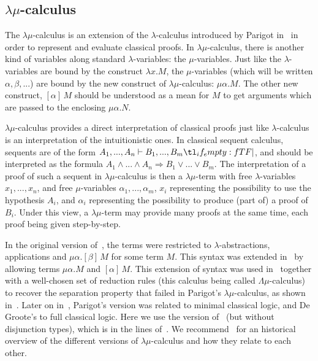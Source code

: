 \documentclass{CSML}
\renewcommand{\ldots}{...}
\newcommand*\ifpresent[3]{\tl_if_empty:fTF{#1}{#3}{#2}}
\newcommand*\Entails{\mathrel{\vdash}}
\newcommand*\BarSep{\mathrel{|}}
\newcommand*\Sequent[3]{#1\Entails#2\ifpresent{#3}{\BarSep}{}#3}
\newcommand*\LogImp{\mathbin{\Rightarrow}}
\newcommand*\LogAnd{\mathbin{\wedge}}
\newcommand*\LogFormA{A}
\newcommand*\LogFormB{B}
\newcommand*\LmTermA{M}
\newcommand*\LmTermB{N}
\newcommand*\LmVarA{x}
\newcommand*\LmMVarA\alpha
\newcommand*\LmMVarB\beta
\begin{document}
\subsection{\texorpdfstring{$\lambda\mu$}{lambda-mu}-calculus}
The $\lambda\mu$-calculus is an extension of the $\lambda$-calculus introduced by Parigot in~\cite{ParigotLambdaMu} in order to represent and evaluate classical proofs. In $\lambda\mu$-calculus, there is another kind of variables along standard $\lambda$-variables: the $\mu$-variables. Just like the $\lambda$-variables are bound by the construct $\lambda\LmVarA.\LmTermA$, the $\mu$-variables (which will be written $\alpha,\beta,\ldots$) are bound by the new construct of $\lambda\mu$-calculus: $\mu\LmMVarA.\LmTermA$. The other new construct, $\left[\LmMVarA\right]\,\LmTermA$ should be understood as a mean for $\LmTermA$ to get arguments which are passed to the enclosing $\mu\LmMVarA.\LmTermB$.\par
$\lambda\mu$-calculus provides a direct interpretation of classical proofs just like $\lambda$-calculus is an interpretation of the intuitionistic ones. In classical sequent calculus, sequents are of the form $\Sequent{\LogFormA_1,\ldots,\LogFormA_n}{\LogFormB_1,\ldots,\LogFormB_m}{}$, and should be interpreted as the formula $\LogFormA_1\LogAnd\ldots\LogAnd\LogFormA_n\LogImp\LogFormB_1\vee\ldots\vee\LogFormB_m$. The interpretation of a proof of such a sequent in $\lambda\mu$-calculus is then a $\lambda\mu$-term with free $\lambda$-variables $\LmVarA_1,\ldots,\LmVarA_n$, and free $\mu$-variables $\LmMVarA_1,\ldots,\LmMVarA_m$, $\LmVarA_i$ representing the possibility to use the hypothesis $\LogFormA_i$, and $\LmMVarA_i$ representing the possibility to produce (part of) a proof of $\LogFormB_i$. Under this view, a $\lambda\mu$-term may provide many proofs at the same time, each proof being given step-by-step.\par
In the original version of~\cite{ParigotLambdaMu}, the terms were restricted to $\lambda$-abstractions, applications and $\mu\LmMVarA.\left[\LmMVarB\right]\,\LmTermA$ for some term $\LmTermA$. This syntax was extended in~\cite{DeGrooteLambdaMu} by allowing terms $\mu\LmMVarA.\LmTermA$ and $\left[\LmMVarA\right]\,\LmTermA$. This extension of syntax was used in~\cite{SaurinLambdaMu} together with a well-chosen set of reduction rules (this calculus being called $\Lambda\mu$-calculus) to recover the separation property that failed in Parigot's $\lambda\mu$-calculus, as shown in~\cite{DavidPyBohm}. Later on in~\cite{ArilaHerbelinSabryContinuations}, Parigot's version was related to minimal classical logic, and De Groote's to full classical logic. Here we use the version of~\cite{SelingerControl} (but without disjunction types), which is in the lines of~\cite{DeGrooteLambdaMu,SaurinLambdaMu}. We recommend~\cite{HerbelinSaurinLambdaMu} for an historical overview of the different versions of $\lambda\mu$-calculus and how they relate to each other.
\end{document}
